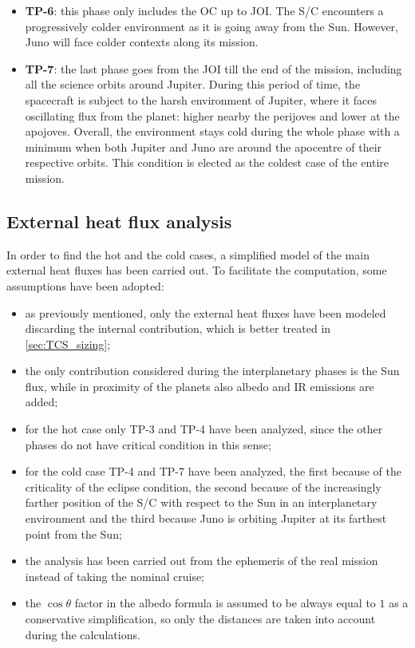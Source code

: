 \begin{itemize}
    \item \textbf{TP-6}:
    this phase only includes the OC up to JOI. The S/C encounters a progressively colder environment as it is going away from the Sun.
    However, Juno will face colder contexts along its mission.

    \item \textbf{TP-7}:
    the last phase goes from the JOI till the end of the mission, including all the science orbits around Jupiter.
    During this period of time, the spacecraft is subject to the harsh environment of Jupiter, where it faces oscillating flux from the planet: higher nearby the perijoves and lower at the apojoves.
    Overall, the environment stays cold during the whole phase with a minimum when both Jupiter and Juno are around the apocentre of their respective orbits. This condition is elected as the coldest case of the entire mission.
    
\end{itemize}


\subsection{External heat flux analysis}
\label{subsec:heat_flux_analysis}

In order to find the hot and the cold cases, a simplified model of the main external heat fluxes has been carried out. To facilitate the computation, some assumptions have been adopted:
\begin{itemize}
    \item as previously mentioned, only the external heat fluxes have been modeled discarding the internal contribution, which is better treated in \autoref{sec:TCS_sizing};
    \item the only contribution considered during the interplanetary phases is the Sun flux, while in proximity of the planets also albedo and IR emissions are added;
    \item for the hot case only TP-3 and TP-4 have been analyzed, since the other phases do not have critical condition in this sense;
    \item for the cold case TP-4 and TP-7 have been analyzed, the first because of the criticality of the eclipse condition, the second because of the increasingly farther position of the S/C with respect to the Sun in an interplanetary environment and the third because Juno is orbiting Jupiter at its farthest point from the Sun;
    \item the analysis has been carried out from the ephemeris of the real mission instead of taking the nominal cruise;
    \item the $\cos \theta$ factor in the albedo formula is assumed to be always equal to $1$ as a conservative simplification, so only the distances are taken into account during the calculations.
\end{itemize}


